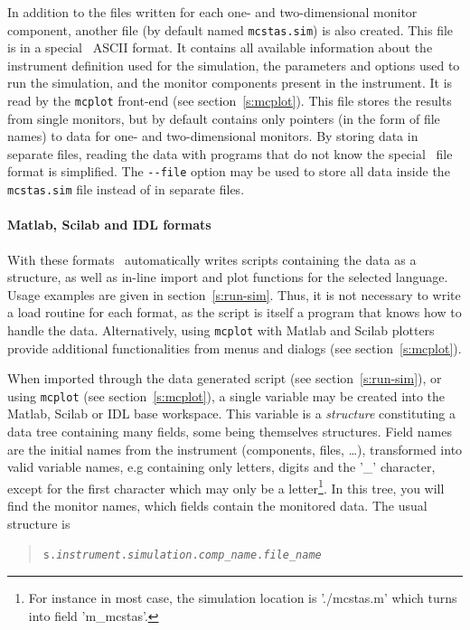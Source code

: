 In addition to the files written for each one- and two-dimensional
monitor component, another file (by default named \verb+mcstas.sim+) is
also created. This file is in a special \MCS\ ASCII format. It contains
all available information about the instrument definition used for the
simulation, the parameters and options used to run the simulation, and
the monitor components present in the instrument. It is read by the
\verb+mcplot+ front-end (see section~\ref{s:mcplot}). This file stores
the results from single monitors, but by default contains only pointers
(in the form of file names) to data for one- and two-dimensional
monitors. By storing data in separate files, reading the data with
programs that do not know the special \MCS\ file format is
simplified. The \verb+--file+ option may be used to store all data
inside the \verb+mcstas.sim+ file instead of in separate files.

\paragraph{Matlab, Scilab and IDL formats}
   

With these formats \MCS\ automatically writes scripts containing the data as a structure, as well as in-line import and plot functions for the selected language. Usage examples are given in section~\ref{s:run-sim}.
Thus, it is not necessary to write a load routine for each format, as the script is itself a program that knows how to handle the data. Alternatively, using \verb+mcplot+ with Matlab and Scilab plotters provide additional functionalities from menus and dialogs (see section~\ref{s:mcplot}).

When imported through the data generated script (see section~\ref{s:run-sim}), or using \verb+mcplot+ (see section~\ref{s:mcplot}), a single variable may be created into the Matlab, Scilab or IDL base workspace. This variable is a \emph{structure} constituting a data tree containing many fields, some being themselves structures. Field names are the initial names from the instrument (components, files, \ldots), transformed into valid variable names, e.g containing only letters, digits and the '\_' character, except for the first character which may only be a letter\footnote{For instance in most case, the simulation location is './mcstas.m' which turns into field 'm\_mcstas'.}.
In this tree, you will find the monitor names, which fields contain the monitored data. The usual structure is
\begin{quote}
  \texttt{s.{\it instrument}.{\it simulation}.{\it comp\_name}.{\it file\_name}}
\end{quote}

